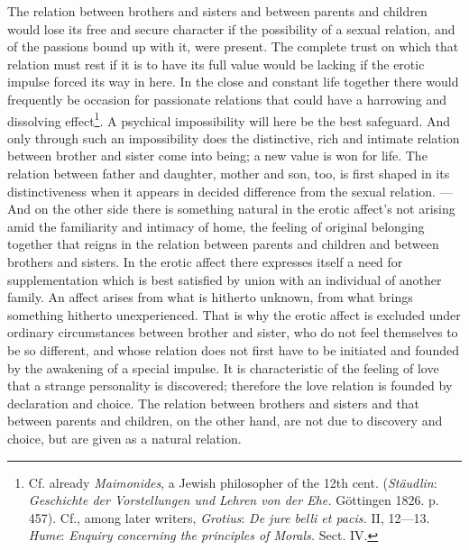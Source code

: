 \documentclass[12pt,a4paper,openany]{book}
\newcommand{\opage}[1]{\marginnote{\footnotesize\textit{[#1]}}}
\begin{document}
The relation between brothers and sisters and between parents and children would lose its free and secure character if
the possibility of a sexual relation, and of the passions bound up with it, were present. The complete trust on which
that relation must rest if it is to have its full value would be lacking if the erotic impulse forced its way in here.
In the close and constant
\opage{303}life together there would frequently be occasion for passionate relations that could have a harrowing and
dissolving effect\footnote[1]{Cf. already \emph{Maimonides}, a Jewish philosopher of the 12th cent. (\emph{Stäudlin}:
\textit{Geschichte der Vorstellungen und Lehren von der Ehe.} Göttingen 1826. p. 457). Cf., among later writers,
\emph{Grotius}: \textit{De jure belli et pacis.} II, 12---13. \emph{Hume}: \textit{Enquiry concerning the principles of
Morals.} Sect. IV.}. A psychical impossibility will here be the best safeguard. And only through such an impossibility
does the distinctive, rich and intimate relation between brother and sister come into being; a new value is won for
life. The relation between father and daughter, mother and son, too, is first shaped in its distinctiveness when it
appears in decided difference from the sexual relation. --- And on the other side there is something natural in the
erotic affect's not arising amid the familiarity and intimacy of home, the feeling of original belonging together that
reigns in the relation between parents and children and between brothers and sisters. In the erotic affect there
expresses itself a need for supplementation which is best satisfied by union with an individual of another family. An
affect arises from what is hitherto unknown, from what brings something hitherto unexperienced. That is why the erotic
affect is excluded under ordinary circumstances between brother and sister, who do not feel themselves to be so
different, and whose relation does not first have to be initiated and founded by the awakening of a special impulse.
It is characteristic of the feeling of love that a strange personality is discovered; therefore the love relation is
founded by declaration and choice. The relation between brothers and sisters and that between parents and children, on
the other hand, are not due to discovery and choice, but are given as a natural relation.
\end{document}
